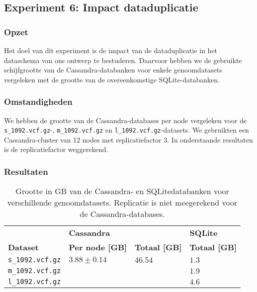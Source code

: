 \subsection{Experiment 6: Impact dataduplicatie}
\label{exp6}

\subsubsection{Opzet}
Het doel van dit experiment is de impact van de dataduplicatie in het dataschema van ons ontwerp te bestuderen. Daarvoor hebben we de gebruikte schijfgrootte van de Cassandra-databanken voor enkele genoomdatasets vergeleken met de grootte van de overeenkomstige SQLite-databanken.

\subsubsection{Omstandigheden}

We hebben de grootte van de Cassandra-databases per node vergeleken voor de \texttt{s\_1092.vcf.gz}-,  \texttt{m\_1092.vcf.gz} en \texttt{l\_1092.vcf.gz}-datasets. We gebruikten een Cassandra-cluster van 12 nodes met replicatiefactor 3. In onderstaande resultaten is de replicatiefactor weggerekend.

\newpage
\subsubsection{Resultaten}

\begin{table}[h]
\centering
\begin{tabular}{@{}llll@{}}
\cmidrule(l){2-4}
                & \multicolumn{2}{|l|}{\textbf{Cassandra}}                                                      & \multicolumn{1}{l|}{\textbf{SQLite}}                             \\ 
\cmidrule(l){1-4}
\multicolumn{1}{|l|}{\textbf{Dataset}}  & \multicolumn{1}{l|}{\textbf{Per node [GB]}}               & \multicolumn{1}{l|}{\textbf{Totaal [GB]}} & \multicolumn{1}{l|}{\textbf{Totaal [GB]}} \\ \midrule
\multicolumn{1}{|l|}{\texttt{s\_1092.vcf.gz}} & \multicolumn{1}{l|}{$3.88 \pm 0.14$}             & \multicolumn{1}{l|}{$46.54$}          & \multicolumn{1}{l|}{$1.3$}                          \\
\multicolumn{1}{|l|}{\texttt{m\_1092.vcf.gz}} & \multicolumn{1}{l|}{$ $}             & \multicolumn{1}{l|}{$ $}          & \multicolumn{1}{l|}{$1.9$}                          \\
\multicolumn{1}{|l|}{\texttt{l\_1092.vcf.gz}} & \multicolumn{1}{l|}{$ $}             & \multicolumn{1}{l|}{$ $}          & \multicolumn{1}{l|}{$4.6$}                          \\
\bottomrule
\end{tabular}
\caption{Grootte in GB van de Cassandra- en SQLitedatabanken voor verschillende genoomdatasets. Replicatie is niet meegerekend voor de Cassandra-databases.}
\end{table}

